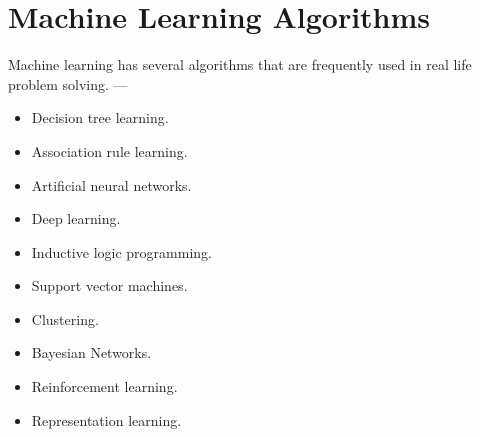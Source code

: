 \section{Machine Learning Algorithms}
Machine learning has several algorithms that are frequently used in real life problem solving. --- 
\begin{itemize}
	\item Decision tree learning.
	\item Association rule learning. 
	\item Artificial neural networks.
	\item Deep learning.
	\item Inductive logic programming.
	\item Support vector machines.
	\item Clustering.
	\item Bayesian Networks.
	\item Reinforcement learning.
	\item Representation learning.
	
\end{itemize}
